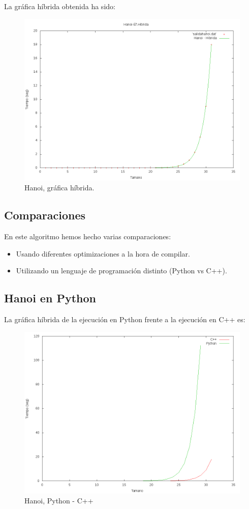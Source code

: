 La gráfica híbrida obtenida ha sido:
\begin{figure}[H]
	\centering
	\includegraphics[scale=0.5]{imagenes/hanoi-hibrido.png}
	\caption{Hanoi, gráfica híbrida.}
	\label{fig:E20}
\end{figure}



\subsection{Comparaciones}
En este algoritmo hemos hecho varias comparaciones:
\begin{itemize}
	\item Usando diferentes optimizaciones a la hora de compilar.
	\item Utilizando un lenguaje de programación distinto (Python vs C++).
\end{itemize}

\subsection{Hanoi en Python}
La gráfica híbrida de la ejecución en Python frente a la ejecución en C++ es:
\begin{figure}[H]
	\centering
	\includegraphics[scale=0.5]{imagenes/HanoiPy.png}
	\caption{Hanoi, Python - C++}
	\label{fig:E21}
\end{figure}




